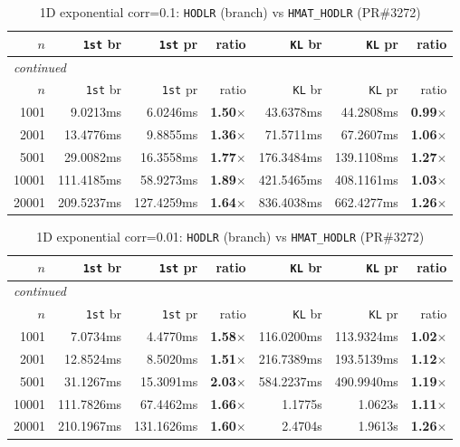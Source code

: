 \documentclass[11pt,a4paper]{article}
\begin{document}
\small\begin{center}
\begin{longtable}{rrrrrrr}
\caption{1D exponential corr=0.1: \texttt{HODLR} (branch) vs \texttt{HMAT\_HODLR} (PR\#3272)}
\\\toprule
$n$ & \texttt{1st} br & \texttt{1st} pr & ratio & \texttt{KL} br & \texttt{KL} pr & ratio\\
\midrule
\endfirsthead
\multicolumn{7}{l}{\small\emph{continued}}\\
\toprule
$n$ & \texttt{1st} br & \texttt{1st} pr & ratio & \texttt{KL} br & \texttt{KL} pr & ratio\\
\midrule
\endhead

1001 & 9.0213ms & 6.0246ms & \textbf{1.50$\times$} & 43.6378ms & 44.2808ms & \textbf{0.99$\times$}\\
2001 & 13.4776ms & 9.8855ms & \textbf{1.36$\times$} & 71.5711ms & 67.2607ms & \textbf{1.06$\times$}\\
5001 & 29.0082ms & 16.3558ms & \textbf{1.77$\times$} & 176.3484ms & 139.1108ms & \textbf{1.27$\times$}\\
10001 & 111.4185ms & 58.9273ms & \textbf{1.89$\times$} & 421.5465ms & 408.1161ms & \textbf{1.03$\times$}\\
20001 & 209.5237ms & 127.4259ms & \textbf{1.64$\times$} & 836.4038ms & 662.4277ms & \textbf{1.26$\times$}\\
\bottomrule\end{longtable}\end{center}
\small\begin{center}
\begin{longtable}{rrrrrrr}
\caption{1D exponential corr=0.01: \texttt{HODLR} (branch) vs \texttt{HMAT\_HODLR} (PR\#3272)}
\\\toprule
$n$ & \texttt{1st} br & \texttt{1st} pr & ratio & \texttt{KL} br & \texttt{KL} pr & ratio\\
\midrule
\endfirsthead
\multicolumn{7}{l}{\small\emph{continued}}\\
\toprule
$n$ & \texttt{1st} br & \texttt{1st} pr & ratio & \texttt{KL} br & \texttt{KL} pr & ratio\\
\midrule
\endhead

1001 & 7.0734ms & 4.4770ms & \textbf{1.58$\times$} & 116.0200ms & 113.9324ms & \textbf{1.02$\times$}\\
2001 & 12.8524ms & 8.5020ms & \textbf{1.51$\times$} & 216.7389ms & 193.5139ms & \textbf{1.12$\times$}\\
5001 & 31.1267ms & 15.3091ms & \textbf{2.03$\times$} & 584.2237ms & 490.9940ms & \textbf{1.19$\times$}\\
10001 & 111.7826ms & 67.4462ms & \textbf{1.66$\times$} & 1.1775s & 1.0623s & \textbf{1.11$\times$}\\
20001 & 210.1967ms & 131.1626ms & \textbf{1.60$\times$} & 2.4704s & 1.9613s & \textbf{1.26$\times$}\\
\bottomrule\end{longtable}\end{center}
\end{document}
